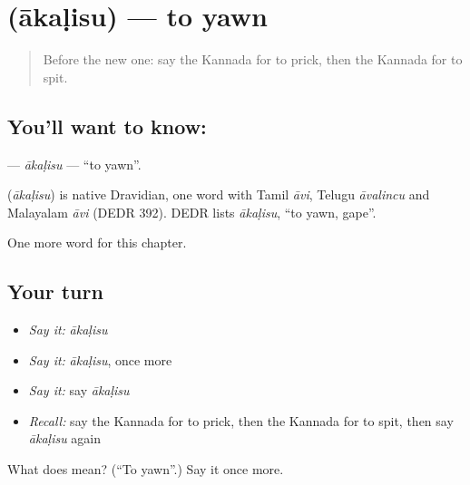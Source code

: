 \section[\texorpdfstring{\kn{ಆಕಳಿಸು} (ākaḷisu)}{ಆಕಳಿಸು (ākaḷisu)}]{ (ākaḷisu) — to yawn}

\label{lesson:KA-C279-akalisu}



\begin{quote}
Before the new one: say the Kannada for to prick, then the Kannada for to spit.
\end{quote}

\subsection*{You'll want to know: }
\textbf{} — \emph{ākaḷisu} — \textquotedblleft{}to yawn\textquotedblright{}.

\begin{cousinweb}
\textbf{} (\emph{ākaḷisu}) is native Dravidian, one word with Tamil \emph{āvi}, Telugu \emph{āvalincu} and Malayalam \emph{āvi} (DEDR 392). DEDR lists \emph{ākaḷisu}, \textquotedblleft{}to yawn, gape\textquotedblright{}.
\end{cousinweb}

\begin{grammarlens}[title={What you've built}]
One more word for this chapter.
\end{grammarlens}

\subsection*{Your turn}
\begin{itemize}
\raggedright
  \item \emph{Say it:} \emph{ākaḷisu}
  \item \emph{Say it:} \emph{ākaḷisu}, once more
  \item \emph{Say it:} say \emph{ākaḷisu}
  \item \emph{Recall:} say the Kannada for to prick, then the Kannada for to spit, then say \emph{ākaḷisu} again
\end{itemize}

\begin{tcolorbox}[breakable,colback=teal!4,colframe=teal!35!black,title={Before you move on}]
What does  mean? (\textquotedblleft{}To yawn\textquotedblright{}.) Say it once more.
\end{tcolorbox}
